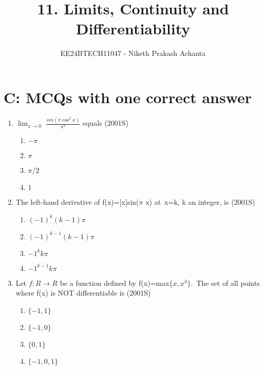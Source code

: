 \documentclass[journal,12pt,twocolumn]{IEEEtran}
\theoremstyle{remark}
\begin{document}

\vspace{3cm}

\title{11. Limits, Continuity and Differentiability}
\author{EE24BTECH11047 - Niketh Prakash Achanta}
\maketitle
\newpage
\bigskip
\section{C: MCQs with one correct answer}

\renewcommand{\thefigure}{\theenumi}
\renewcommand{\thetable}{\theenumi}
\begin{enumerate}
\item %

 $\lim_{x\to0}$  $\frac{sin(\pi \cos^2 x )}{x^2}$ \: equals \hfill{(2001S)}
    \begin{enumerate}
     \item $-\pi$
     \item $\pi$
     \item $\pi/2$
     \item $1$\\
     \end{enumerate}

\item %
    The left-hand derivative of f(x)=[x]sin($\pi$ x) at\ x=k, k an integer, is \hfill{(2001S)}
    \begin{enumerate}
     \item $(-1)^k (k-1) \pi$
     \item $(-1)^{k-1} (k-1) \pi$
     \item $-1^k k\pi$
     \item $-1^{k-1} k\pi$\\
    \end{enumerate}

\item %

    Let $f:R\rightarrow R$ be a function defined by f(x)=max$\{x,x^3\}$.\ The set of all points where f(x) is NOT differentiable is \hfill{(2001S)}
    \begin{enumerate}
     \item $\{-1,1\}$
     \item $\{-1,0\}$
     \item $\{0,1\}$
     \item $\{-1,0,1\}$\\
    \end{enumerate}



\end{enumerate}
\end{document}
